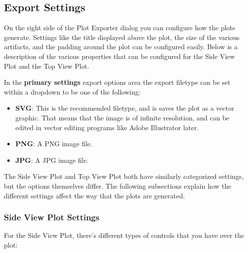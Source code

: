 \documentclass[titlepage]{article}
\begin{document}
\subsection{Export Settings}

On the right side of the Plot Exporter dialog you can configure how the plots generate. Settings like the title displayed above the plot, the size of the various artifacts, and the padding around the plot can be configured easily. Below is a description of the various properties that can be configured for the Side View Plot and the Top View Plot.

In the \textbf{primary settings} export options area the export filetype can be set within a dropdown to be one of the following:

\begin{itemize}
	\item \textbf{SVG}: This is the recommended filetype, and is saves the plot as a vector graphic. That means that the image is of infinite resolution, and can be edited in vector editing programs like Adobe Illustrator later.
	\item \textbf{PNG}: A PNG image file.
	\item \textbf{JPG}: A JPG image file.  
\end{itemize}

The Side View Plot and Top View Plot both have similarly categorized settings, but the options themselves differ. The following subsections explain how the different settings affect the way that the plots are generated.

\subsubsection{Side View Plot Settings}

For the Side View Plot, there's different types of controls that you have over the plot:
\end{document}

